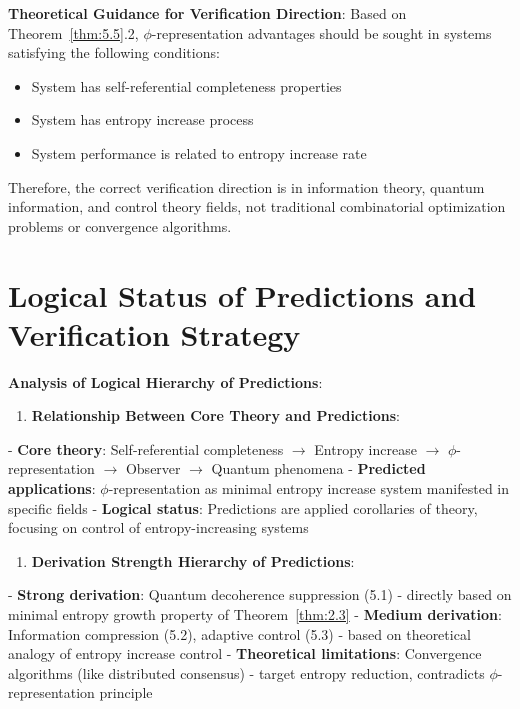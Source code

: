 \textbf{Theoretical Guidance for Verification Direction}:
Based on Theorem~\ref{thm:5.5}.2, $\phi$-representation advantages should be sought in systems satisfying the following conditions:

\begin{itemize}
\item System has self-referential completeness properties
\item System has entropy increase process
\item System performance is related to entropy increase rate
\end{itemize}

Therefore, the correct verification direction is in information theory, quantum information, and control theory fields, not traditional combinatorial optimization problems or convergence algorithms.

\section{Logical Status of Predictions and Verification Strategy}
\label{sec:ch07_applications:logical-status-of-predictions-and-verification-strategy}

\textbf{Analysis of Logical Hierarchy of Predictions}:

\begin{enumerate}
\item \textbf{Relationship Between Core Theory and Predictions}:
\end{enumerate}
   - \textbf{Core theory}: Self-referential completeness $\rightarrow$ Entropy increase $\rightarrow$ $\phi$-representation $\rightarrow$ Observer $\rightarrow$ Quantum phenomena
   - \textbf{Predicted applications}: $\phi$-representation as minimal entropy increase system manifested in specific fields
   - \textbf{Logical status}: Predictions are applied corollaries of theory, focusing on control of entropy-increasing systems

\begin{enumerate}
\item \textbf{Derivation Strength Hierarchy of Predictions}:
\end{enumerate}
   - \textbf{Strong derivation}: Quantum decoherence suppression (5.1) - directly based on minimal entropy growth property of Theorem~\ref{thm:2.3}
   - \textbf{Medium derivation}: Information compression (5.2), adaptive control (5.3) - based on theoretical analogy of entropy increase control
   - \textbf{Theoretical limitations}: Convergence algorithms (like distributed consensus) - target entropy reduction, contradicts $\phi$-representation principle
   
